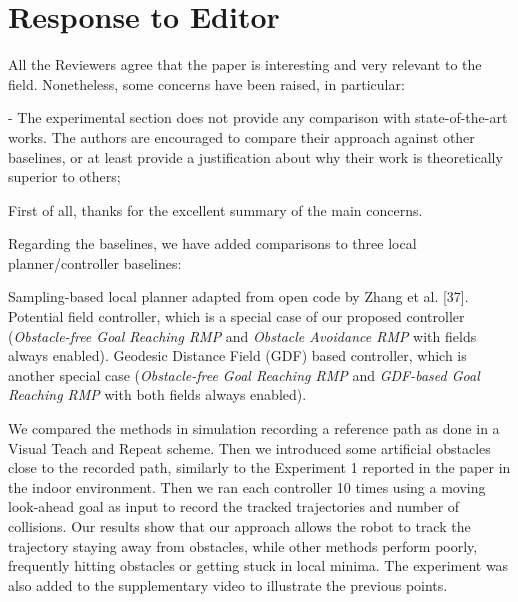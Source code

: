 \documentclass[a4paper,11pt]{article}
\begin{document}
\pagebreak
\section*{Response to Editor}

\begin{displayquote}
  All the Reviewers agree that the paper is interesting and very relevant
to the field. Nonetheless, some concerns have been raised, in
particular: 

- The experimental section does not provide any comparison with
state-of-the-art works. The authors are encouraged to compare their
approach against other baselines, or at least provide a justification
about why their work is theoretically superior to others;
\end{displayquote}

First of all, thanks for the excellent summary of the main concerns. 
\begin{outline}[enumerate]
\1 Regarding  the baselines, we have added comparisons to three local 
planner/controller baselines:

	\2 Sampling-based local planner adapted from open code by Zhang et 
	al. [37].
	\2 Potential field controller, which is a special case of our proposed 
	controller (\emph{Obstacle-free Goal Reaching RMP} and \emph{Obstacle 
	Avoidance RMP} with fields always enabled).
	\2 Geodesic Distance Field (GDF) based controller, which is another 
	special case (\emph{Obstacle-free Goal Reaching RMP} and \emph{GDF-based 
	Goal Reaching RMP} with both fields always enabled).

\1 We compared the methods in simulation recording a reference path as done 
in a Visual Teach and Repeat scheme. Then we introduced some artificial 
obstacles close to the recorded path, similarly to the Experiment 1 reported in 
the paper in the indoor environment. 
\1 Then we ran each controller 10 times using a 
moving look-ahead goal as input to record the tracked trajectories and number 
of collisions.
\1 Our results show that our approach allows the robot to track the trajectory 
staying away from obstacles, while other methods perform poorly, frequently 
hitting obstacles or getting stuck in local minima.
\1 The experiment was also added to the supplementary video to illustrate the 
previous points.
\end{outline}

\end{document}
